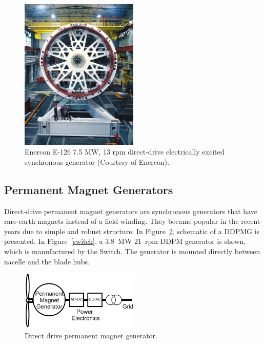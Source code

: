 \documentclass[a4paper, 11pt]{article} %
\begin{document}
  \begin{figure}
    \centering
    \includegraphics[width=0.5\textwidth]{enercon}
    \caption{Enercon E-126 7.5 MW, 13 rpm direct-drive electrically excited synchronous generator (Courtesy of Enercon).} 
    \label{enercon}
  \end{figure}


\subsection{Permanent Magnet Generators}

Direct-drive permanent magnet generators are synchronous generators that have rare-earth magnets instead of a field winding. They became popular in the recent years due to simple and robust structure. In Figure~\ref{ddpmg}, schematic of a DDPMG is presented. In Figure~\ref{switch}, a 3.8~MW 21~rpm DDPM generator is shown, which is manufactured by the Switch. The generator is mounted directly between nacelle and the blade hubs.

\begin{figure}
    \centering
    \includegraphics[width=0.5\textwidth]{DDPMG}
    \caption{Direct drive permanent magnet generator.} 
    \label{ddpmg}
\end{figure}
\end{document}
